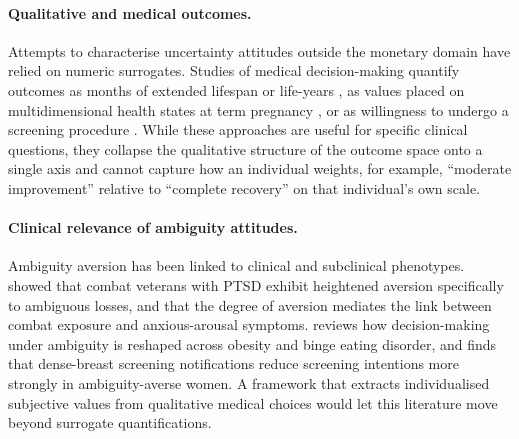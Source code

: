 \documentclass[11pt]{article}
\begin{document}
\paragraph{Qualitative and medical outcomes.} Attempts to characterise uncertainty attitudes outside the monetary domain have relied on numeric surrogates. Studies of medical decision-making quantify outcomes as months of extended lifespan or life-years \citep{basu2018vio}, as values placed on multidimensional health states at term pregnancy \citep{bijlenga2007balance}, or as willingness to undergo a screening procedure \citep{yeh2015dense,james2017prostate}. While these approaches are useful for specific clinical questions, they collapse the qualitative structure of the outcome space onto a single axis and cannot capture how an individual weights, for example, ``moderate improvement'' relative to ``complete recovery'' on that individual's own scale.

\paragraph{Clinical relevance of ambiguity attitudes.} Ambiguity aversion has been linked to clinical and subclinical phenotypes. \citet{ruderman2016ptsd} showed that combat veterans with PTSD exhibit heightened aversion specifically to ambiguous losses, and that the degree of aversion mediates the link between combat exposure and anxious-arousal symptoms. \citet{voon2015bed} reviews how decision-making under ambiguity is reshaped across obesity and binge eating disorder, and \citet{yeh2015dense} finds that dense-breast screening notifications reduce screening intentions more strongly in ambiguity-averse women. A framework that extracts individualised subjective values from qualitative medical choices would let this literature move beyond surrogate quantifications.
\end{document}
